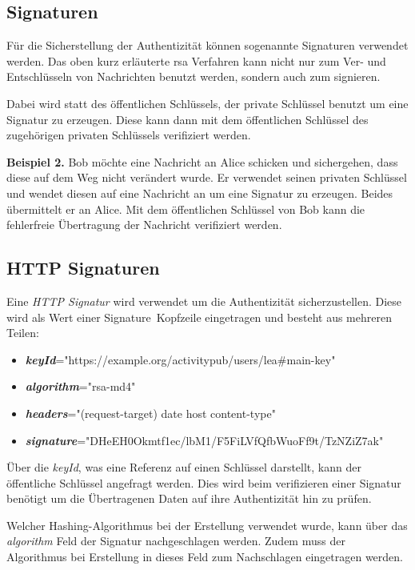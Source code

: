 {	\subsection{Signaturen}
	Für die Sicherstellung der Authentizität können sogenannte Signaturen verwendet werden. Das oben kurz erläuterte \gls{rsa} Verfahren kann nicht nur zum Ver- und Entschlüsseln von Nachrichten benutzt werden, sondern auch zum signieren.\par
	Dabei wird statt des öffentlichen Schlüssels, der private Schlüssel benutzt um eine Signatur zu erzeugen. Diese kann dann mit dem öffentlichen Schlüssel des zugehörigen privaten Schlüssels verifiziert werden.\par
	
	\textbf{Beispiel 2.} Bob möchte eine Nachricht an Alice schicken und sichergehen, dass diese auf dem Weg nicht verändert wurde. Er verwendet seinen privaten Schlüssel und wendet diesen auf eine Nachricht an um eine Signatur zu erzeugen. Beides übermittelt er an Alice. Mit dem öffentlichen Schlüssel von Bob kann die fehlerfreie Übertragung der Nachricht verifiziert werden.\par
	
	\subsection{HTTP Signaturen}
	Eine \textit{HTTP Signatur} wird verwendet um die Authentizität sicherzustellen. Diese wird als Wert einer \glqq Signature\grqq~Kopfzeile eingetragen und besteht aus mehreren Teilen:
	\begin{itemize}
		\item \textit{\textbf{keyId}}="https://example.org/activitypub/users/lea\#main-key"
		\item \textit{\textbf{algorithm}}="rsa-md4"
		\item \textit{\textbf{headers}}="(request-target) date host content-type"
		\item \textit{\textbf{signature}}="DHeEH0Okmtf1ec/lbM1/F5FiLVfQfbWuoFf9t/TzNZiZ7ak"
	\end{itemize}
	Über die \textit{keyId}, was eine Referenz auf einen Schlüssel darstellt, kann der öffentliche Schlüssel angefragt werden. Dies wird beim verifizieren einer Signatur benötigt um die Übertragenen Daten auf ihre Authentizität hin zu prüfen.\par
	
	Welcher Hashing-Algorithmus bei der Erstellung verwendet wurde, kann über das \textit{algorithm} Feld der Signatur nachgeschlagen werden. Zudem muss der Algorithmus bei Erstellung in dieses Feld zum Nachschlagen eingetragen werden.\par
	
}
